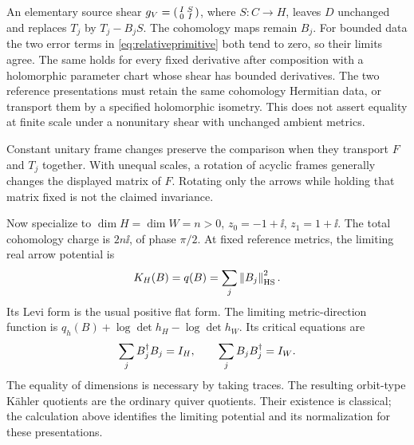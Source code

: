 An elementary source shear
$g_V=\left(\begin{smallmatrix}I&S\\0&I\end{smallmatrix}\right)$,
where $S:C\to H$, leaves $D$ unchanged and replaces
$T_j$ by $T_j-B_jS$. The cohomology maps remain $B_j$.
For bounded data the two error terms in \eqref{eq:relativeprimitive}
both tend to zero, so their limits agree.
The same holds for every fixed derivative after composition with a
holomorphic parameter chart whose shear has bounded derivatives.
The two reference presentations must retain the same cohomology
Hermitian data, or transport them by a specified holomorphic isometry.
This does not assert equality at finite scale under a nonunitary shear
with unchanged ambient metrics.

Constant unitary frame changes preserve the comparison when they
transport $F$ and $T_j$ together. With unequal scales, a rotation of
acyclic frames generally changes the displayed matrix of $F$.
Rotating only the arrows while holding that matrix fixed is not the
claimed invariance.

Now specialize to $\dim H=\dim W=n>0$, $z_0=-1+\ii$, $z_1=1+\ii$.
The total cohomology charge is $2n\ii$, of phase $\pi/2$.
At fixed reference metrics, the limiting real arrow potential is
\begin{equation}\label{eq:limitpotential}
 K_H(B)=q(B)=\sum_j\left\lVert B_j\right\rVert_{\mathrm{HS}}^2.
\end{equation}
Its Levi form is the usual positive flat form. The limiting
metric-direction function is
$q_h(B)+\log\det h_H-\log\det h_W$.
Its critical equations are
\begin{equation}\label{eq:ordinarybalance}
 \sum_jB_j^\dagger B_j=I_H,\qquad
 \sum_jB_jB_j^\dagger=I_W.
\end{equation}
The equality of dimensions is necessary by taking traces.
The resulting orbit-type K\"ahler quotients are the ordinary quiver
quotients. Their existence is classical; the calculation above
identifies the limiting potential and its normalization for these
presentations.

